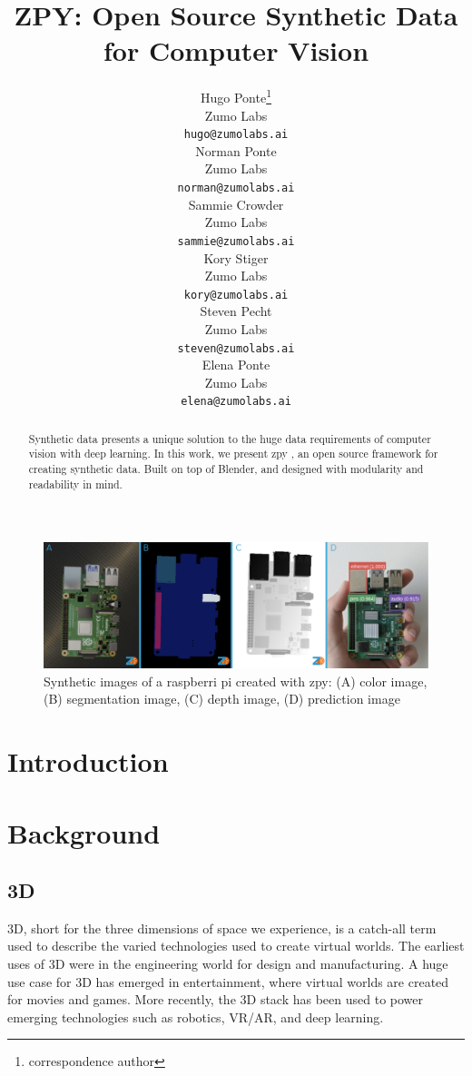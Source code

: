 \documentclass{article}
\title{ZPY: Open Source Synthetic Data for Computer Vision}
\author{
	{\hspace{1mm}Hugo Ponte}\thanks{correspondence author} \\ 
	Zumo Labs \\
	\texttt{hugo@zumolabs.ai} \\
	\And
	{\hspace{1mm}Norman Ponte} \\
	Zumo Labs \\
	\texttt{norman@zumolabs.ai} \\
	\And
	{\hspace{1mm}Sammie Crowder} \\
	Zumo Labs \\
	\texttt{sammie@zumolabs.ai} \\
	\And
	{\hspace{1mm}Kory Stiger} \\
	Zumo Labs \\
	\texttt{kory@zumolabs.ai} \\
	\And
	{\hspace{1mm}Steven Pecht} \\
	Zumo Labs \\
	\texttt{steven@zumolabs.ai} \\
	\And
	{\hspace{1mm}Elena Ponte} \\
	Zumo Labs \\
	\texttt{elena@zumolabs.ai} \\
}
\date{}
\begin{document}
\maketitle

\begin{abstract}
Synthetic data presents a unique solution to the huge data requirements of computer vision with deep learning.
In this work, we present zpy \citep{zpy}, an open source framework for creating synthetic data. Built on top of Blender,
and designed with modularity and readability in mind.
\end{abstract}


\begin{figure}[!ht]
	\centering
	\includegraphics[width=\textwidth]{cover.png}
	\caption{Synthetic images of a raspberri pi created with zpy: (A) color image, (B) segmentation image, (C) depth image, (D) prediction image}
	\label{fig:fig1}
\end{figure}

\section{Introduction}
\label{sec:introduction}
\lipsum[2]

\section{Background}
\label{sec:background}
\lipsum[2]

\subsection{3D}

3D, short for the three dimensions of space we experience,  is a catch-all term used to describe the
 varied technologies used to create virtual worlds. The earliest uses of 3D were in the engineering 
 world for design and manufacturing. A huge use case for 3D has emerged in entertainment, where 
 virtual worlds are created for movies and games. More recently, the 3D stack has been used to power 
 emerging technologies such as robotics, VR/AR, and deep learning.
\end{document}
